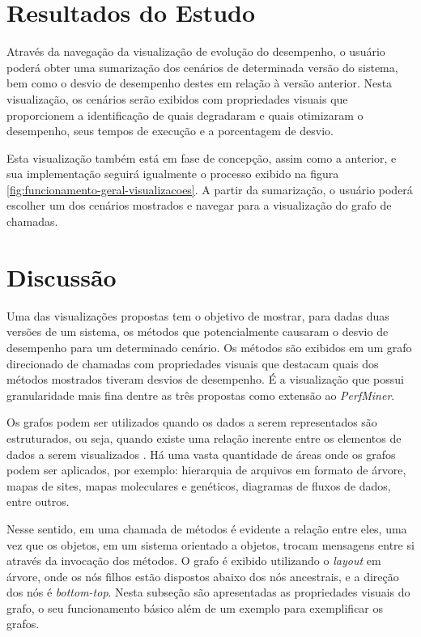 \section{Resultados do Estudo} \label{sec:resultados}

Através da navegação da visualização de evolução do desempenho, o usuário poderá obter uma sumarização dos cenários de determinada versão do sistema, bem como o desvio de desempenho destes em relação à versão anterior. Nesta visualização, os cenários serão exibidos com propriedades visuais que proporcionem a identificação de quais degradaram e quais otimizaram o desempenho, seus tempos de execução e a porcentagem de desvio.

Esta visualização também está em fase de concepção, assim como a anterior, e sua implementação seguirá igualmente o processo exibido na figura \ref{fig:funcionamento-geral-visualizacoes}. A partir da sumarização, o usuário poderá escolher um dos cenários mostrados e navegar para a visualização do grafo de chamadas.

\section{Discussão} \label{sec:discussao}

Uma das visualizações propostas tem o objetivo de mostrar, para dadas duas versões de um sistema, os métodos que potencialmente causaram o desvio de desempenho para um determinado cenário. Os métodos são exibidos em um grafo direcionado de chamadas com propriedades visuais que destacam quais dos métodos mostrados tiveram desvios de desempenho. É a visualização que possui granularidade mais fina dentre as três propostas como extensão ao \textit{PerfMiner}.

Os grafos podem ser utilizados quando os dados a serem representados são estruturados, ou seja, quando existe uma relação inerente entre os elementos de dados a serem visualizados \cite{Herman2000}. Há uma vasta quantidade de áreas onde os grafos podem ser aplicados, por exemplo: hierarquia de arquivos em formato de árvore, mapas de sites, mapas moleculares e genéticos, diagramas de fluxos de dados, entre outros.

Nesse sentido, em uma chamada de métodos é evidente a relação entre eles, uma vez que os objetos, em um sistema orientado a objetos, trocam mensagens entre si através da invocação dos métodos. O grafo é exibido utilizando o \textit{layout} em árvore, onde os nós filhos estão dispostos abaixo dos nós ancestrais, e a direção dos nós é \textit{bottom-top}. Nesta subseção são apresentadas as propriedades visuais do grafo, o seu funcionamento básico além de um exemplo para exemplificar os grafos.

